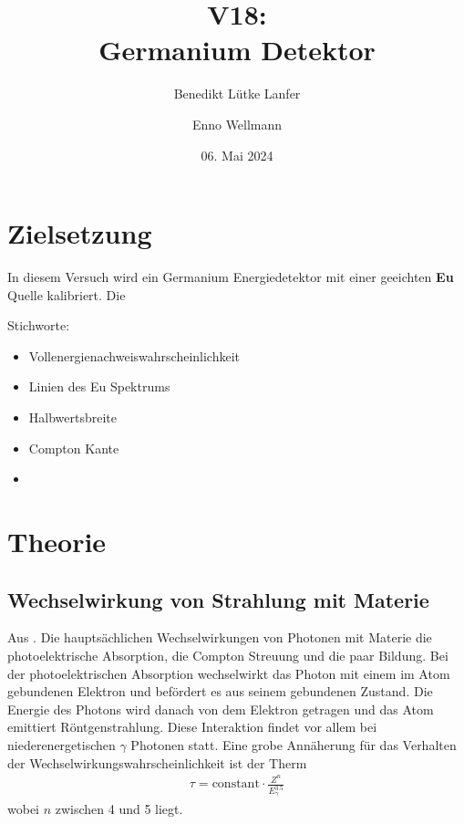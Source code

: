 

\title{V18:\\ Germanium Detektor}
\author{Benedikt Lütke Lanfer \and Enno Wellmann}
\date{06. Mai 2024}
\publishers{TU Dortmund – Fakultät Physik}



\tableofcontents
\newpage

\section{Zielsetzung}
In diesem Versuch wird ein Germanium Energiedetektor mit einer geeichten \textbf{Eu} Quelle kalibriert.
Die

Stichworte:
\begin{itemize}
    \item Vollenergienachweiswahrscheinlichkeit
    \item Linien des Eu Spektrums 
    \item Halbwertsbreite
    \item Compton Kante
    \item 
\end{itemize}




\section{Theorie}
\subsection[]{Wechselwirkung von Strahlung mit Materie}
Aus \cite{book:knoll}.
Die hauptsächlichen Wechselwirkungen von Photonen mit Materie die photoelektrische Absorption,
die Compton Streuung und die paar Bildung.
Bei der photoelektrischen  Absorption wechselwirkt das Photon mit einem im Atom gebundenen Elektron und befördert es aus seinem gebundenen Zustand.
Die Energie des Photons wird danach von dem Elektron getragen und das Atom emittiert Röntgenstrahlung.
Diese Interaktion findet vor allem bei niederenergetischen $\gamma$ Photonen statt. 
Eine grobe Annäherung für das Verhalten der Wechselwirkungswahrscheinlichkeit
ist der Therm 
\begin{align}
    \tau = \text{constant} \cdot \frac{Z^n}{E_{\gamma}^{3.5}}
\end{align} %
wobei $n$ zwischen 4 und 5 liegt.

